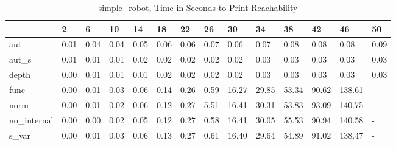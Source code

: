 \begin{table}
\caption{simple_robot, Time in Seconds to Print Reachability}
\label{simple_robot_states_time}
\begin{tabular}{llllllllllllll}
\toprule
 & 2 & 6 & 10 & 14 & 18 & 22 & 26 & 30 & 34 & 38 & 42 & 46 & 50 \\
\midrule
aut & 0.01 & 0.04 & 0.04 & 0.05 & 0.06 & 0.06 & 0.07 & 0.06 & 0.07 & 0.08 & 0.08 & 0.08 & 0.09 \\
aut_s & 0.01 & 0.01 & 0.01 & 0.02 & 0.02 & 0.02 & 0.02 & 0.02 & 0.03 & 0.03 & 0.03 & 0.03 & 0.03 \\
depth & 0.00 & 0.01 & 0.01 & 0.01 & 0.02 & 0.02 & 0.02 & 0.02 & 0.03 & 0.03 & 0.03 & 0.03 & 0.03 \\
func & 0.00 & 0.01 & 0.03 & 0.06 & 0.14 & 0.26 & 0.59 & 16.27 & 29.85 & 53.34 & 90.62 & 138.61 & - \\
norm & 0.00 & 0.01 & 0.02 & 0.06 & 0.12 & 0.27 & 5.51 & 16.41 & 30.31 & 53.83 & 93.09 & 140.75 & - \\
no_internal & 0.00 & 0.00 & 0.02 & 0.05 & 0.12 & 0.27 & 0.58 & 16.41 & 30.05 & 55.53 & 90.94 & 140.58 & - \\
s_var & 0.00 & 0.01 & 0.03 & 0.06 & 0.13 & 0.27 & 0.61 & 16.40 & 29.64 & 54.89 & 91.02 & 138.47 & - \\
\bottomrule
\end{tabular}
\end{table}
